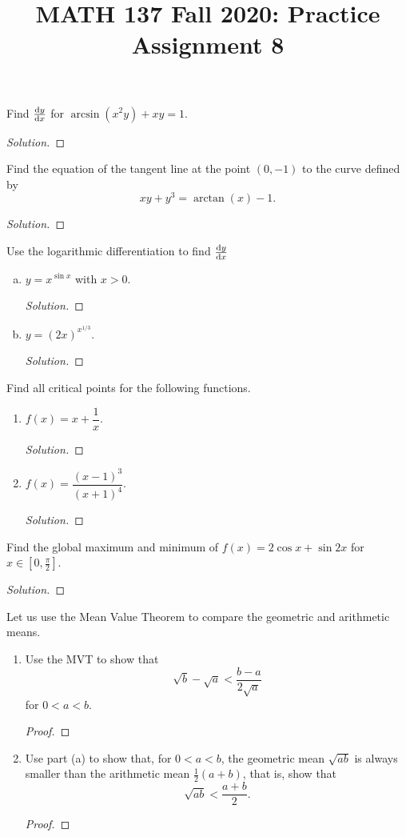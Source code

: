 
\title{MATH 137 Fall 2020: Practice Assignment 8}


\thispagestyle{firstpage}

\textbf{\@title}

\question Find $\dv{y}{x}$ for $\arcsin(x^2y)+xy=1$.
\begin{proof}[Solution]
\end{proof}


\question Find the equation of the tangent line at the point $(0, -1)$ to the curve defined by
\[ xy+y^3 = \arctan(x)-1. \]
\begin{proof}[Solution]
\end{proof}


\question Use the logarithmic differentiation to find $\dv{y}{x}$
\begin{enumerate}[(a)]
  \item $y=x^{\sin x}$ with $x > 0$.
        \begin{proof}[Solution]
        \end{proof}
  \item $y=(2x)^{x^{1/3}}$.
        \begin{proof}[Solution]
        \end{proof}
\end{enumerate}

\question Find all critical points for the following functions.
\begin{enumerate}
  \item $f(x)=x+\dfrac{1}{x}$.
        \begin{proof}[Solution]
        \end{proof}
  \item $f(x)=\dfrac{(x-1)^3}{(x+1)^4}$.
        \begin{proof}[Solution]
        \end{proof}
\end{enumerate}


\question Find the global maximum and minimum of $f(x)=2\cos x + \sin 2x$ for $x \in [0,\frac\pi2]$.
\begin{proof}[Solution]
\end{proof}


\question Let us use the Mean Value Theorem to compare the geometric and arithmetic means.
\begin{enumerate}
  \item Use the MVT to show that \[ \sqrt{b} - \sqrt{a} < \frac{b-a}{2\sqrt{a}} \] for $0 < a < b$.
        \begin{proof}
        \end{proof}
  \item Use part (a) to show that, for $0 < a < b$,
        the geometric mean $\sqrt{ab}$ is always smaller than the arithmetic mean $\frac12(a+b)$,
        that is, show that \[ \sqrt{ab} < \frac{a+b}{2}. \]
        \begin{proof}
        \end{proof}
\end{enumerate}


